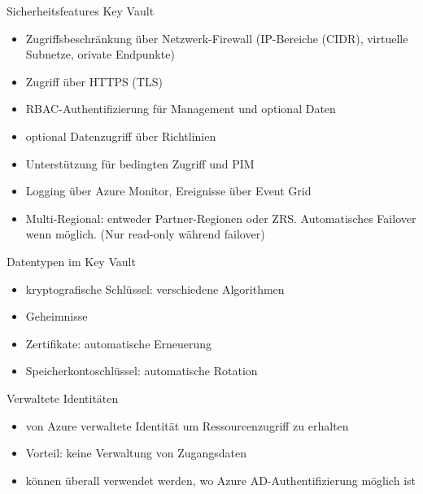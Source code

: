 \begin{flashcard}[Definition]{Sicherheitsfeatures Key Vault}
  \begin{itemize}
    \item Zugriffsbeschränkung über Netzwerk-Firewall\newline
      (IP-Bereiche (CIDR), virtuelle Subnetze, orivate Endpunkte)
    \item Zugriff über HTTPS (TLS)
    \item RBAC-Authentifizierung für Management und optional Daten
    \item optional Datenzugriff über Richtlinien
    \item Unterstützung für bedingten Zugriff und PIM
    \item Logging über Azure Monitor, Ereignisse über Event Grid
    \item Multi-Regional: entweder Partner-Regionen oder ZRS.\newline
      Automatisches Failover wenn möglich. (Nur read-only während failover)
  \end{itemize}
\end{flashcard}

\begin{flashcard}[Definition]{Datentypen im Key Vault}
  \begin{itemize}
    \item kryptografische Schlüssel: verschiedene Algorithmen
    \item Geheimnisse
    \item Zertifikate: automatische Erneuerung
    \item Speicherkontoschlüssel: automatische Rotation
  \end{itemize}
\end{flashcard}


\begin{flashcard}[Definition]{Verwaltete Identitäten}
  \begin{itemize}
    \item von Azure verwaltete Identität um Ressourcenzugriff zu erhalten
    \item Vorteil: keine Verwaltung von Zugangsdaten
    \item können überall verwendet werden, wo Azure AD-Authentifizierung möglich ist
  \end{itemize}
\end{flashcard}

